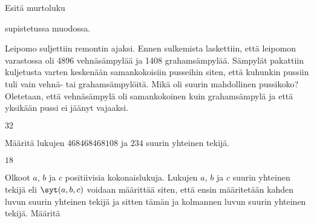 \begin{tehtava}
    Esitä murtoluku
    \begin{alakohdat}
    \end{alakohdat}
    supistetussa muodossa.

    \begin{vastaus}
        \begin{alakohdat}
        \end{alakohdat}
    \end{vastaus}
    
\end{tehtava}

\begin{tehtava}
    Leipomo suljettiin remontin ajaksi. Ennen sulkemista laskettiin, että leipomon varastossa oli 4896 vehnäsämpylää ja 1408 grahamsämpylää. Sämpylät pakattiin kuljetusta varten keskenään samankokoisiin pusseihin siten, että kuhunkin pussiin tuli vain vehnä- tai grahamsämpylöitä. Mikä oli suurin mahdollinen pussikoko? Oletetaan, että vehnäsämpylä oli samankokoinen kuin grahamsämpylä ja että yksikään pussi ei jäänyt vajaaksi.

    \begin{vastaus}
        $32$
    \end{vastaus}
    
\end{tehtava}

\begin{tehtava}
    Määritä lukujen $468468468108$ ja $234$ suurin yhteinen tekijä.
    
    \begin{vastaus}
        $18$
    \end{vastaus}
    
\end{tehtava}

\begin{tehtava}
    Olkoot $a$, $b$ ja $c$ positiivisia kokonaislukuja. Lukujen $a$, $b$ ja $c$ suurin yhteinen tekijä eli $\syt(a, b, c)$ voidaan määrittää siten, että ensin määritetään kahden luvun suurin yhteinen tekijä ja sitten tämän ja kolmannen luvun suurin yhteinen tekijä. Määritä
    
    \begin{alakohdat}
    \end{alakohdat}

    \begin{vastaus}
        \begin{alakohdat}
        \end{alakohdat}
    \end{vastaus}
    
\end{tehtava}

